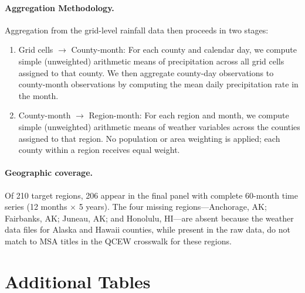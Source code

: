 \documentclass[12pt]{article}
\begin{document}
\paragraph{Aggregation Methodology.}
Aggregation from the grid-level rainfall data then proceeds in two stages:
\begin{enumerate}
    \item {Grid cells $\to$ County-month:} For each county and calendar day, we compute simple (unweighted) arithmetic
means of precipitation across all grid cells
assigned to that county. We then aggregate county-day observations to county-month observations by computing the mean daily precipitation rate in the month.
\item {County-month $\to$ Region-month:}
For each region and month, we compute simple (unweighted) arithmetic means of weather variables across the counties assigned to that region. No population or area weighting is applied; each county within a region receives equal weight.

\end{enumerate}

\paragraph{Geographic coverage.}
Of 210 target regions, 206 appear in the final panel with complete 60-month
time series (12 months $\times$ 5 years). The four missing regions---Anchorage,
AK; Fairbanks, AK; Juneau, AK; and Honolulu, HI---are absent because the
weather data files for Alaska and Hawaii counties, while present in the raw
data, do not match to MSA titles in the QCEW crosswalk for these regions.



\section{Additional Tables}









\end{document}
